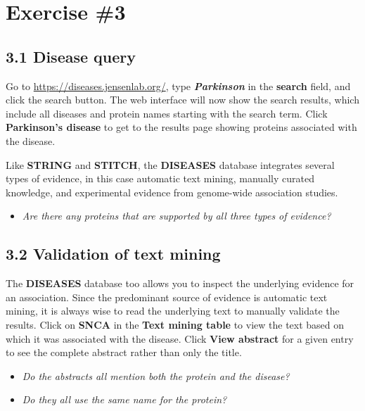 \documentclass[a4paper]{article}
\begin{document}
\section*{Exercise \#3}

\vspace{0,5cm}

\subsection*{3.1 Disease query}

Go to \url{https://diseases.jensenlab.org/}, type \textbf{\textit{Parkinson}} in the \textbf{search} field, and click the search button. The web interface will now show the search results, which include all diseases and protein names starting with the search term. Click \textbf{Parkinson’s disease} to get to the results page showing proteins associated with the disease.

\vspace{0,25cm}

Like \textbf{STRING} and \textbf{STITCH}, the \textbf{DISEASES} database integrates several types of evidence, in this case automatic text mining, manually curated knowledge, and experimental evidence from genome-wide association studies.

\begin{itemize}
  \item \textit{Are there any proteins that are supported by all three types of evidence?}
\end{itemize}

\vspace{0,5cm}

\subsection*{3.2 Validation of text mining}
The \textbf{DISEASES} database too allows you to inspect the underlying evidence for an association. Since the predominant source of evidence is automatic text mining, it is always wise to read the underlying text to manually validate the results. Click on \textbf{SNCA} in the \textbf{Text mining table} to view the text based on which it was associated with the disease. Click \textbf{View abstract} for a given entry to see the complete abstract rather than only the title.

\begin{itemize}
  \item \textit{Do the abstracts all mention both the protein and the disease?}
  \item \textit{Do they all use the same name for the protein?}
\end{itemize}
\end{document}
